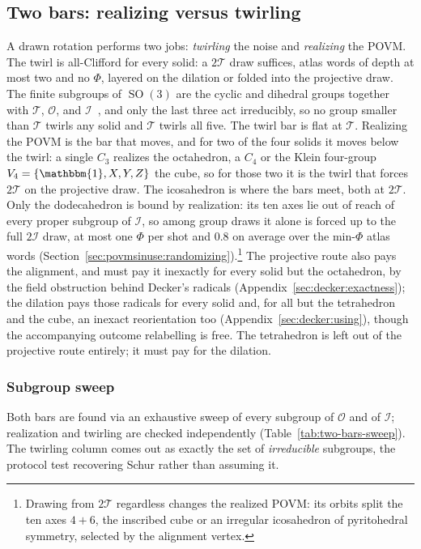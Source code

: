 \documentclass[11pt, oneside, openany]{scrbook}
\DeclareMathOperator{\SO}{SO}
\newcommand{\Id}{\mathbbm{1}}
\newcommand{\Tgroup}{\mathcal{T}}  %
\newcommand{\Ogroup}{\mathcal{O}}  %
\newcommand{\Igroup}{\mathcal{I}}  %
\newcommand{\TwoT}{2\Tgroup}
\newcommand{\TwoI}{2\Igroup}
\begin{document}
\subsection{Two bars: realizing versus twirling} \label{sec:shadows:bills}

A drawn rotation performs two jobs: \textit{twirling} the noise and \textit{realizing} the POVM. The twirl is all-Clifford for every solid: a $\TwoT$ draw suffices, atlas words of depth at most two and no $\Phi$, layered on the dilation or folded into the projective draw. The finite subgroups of $\SO(3)$ are the cyclic and dihedral groups together with $\Tgroup$, $\Ogroup$, and $\Igroup$~\cite{artin2011algebra}, and only the last three act irreducibly, so no group smaller than $\Tgroup$ twirls any solid and $\Tgroup$ twirls all five. The twirl bar is flat at $\Tgroup$. Realizing the POVM is the bar that moves, and for two of the four solids it moves below the twirl: a single $C_3$ realizes the octahedron, a $C_4$ or the Klein four-group $V_4 = \{\Id, X, Y, Z\}$ the cube, so for those two it is the twirl that forces $\TwoT$ on the projective draw. The icosahedron is where the bars meet, both at $\TwoT$. Only the dodecahedron is bound by realization: its ten axes lie out of reach of every proper subgroup of $\Igroup$, so among group draws it alone is forced up to the full $\TwoI$ draw, at most one $\Phi$ per shot and $0.8$ on average over the min-$\Phi$ atlas words (Section~\ref{sec:povmsinuse:randomizing}).\footnote{Drawing from $\TwoT$ regardless changes the realized POVM: its orbits split the ten axes $4 + 6$, the inscribed cube or an irregular icosahedron of pyritohedral symmetry, selected by the alignment vertex.} The projective route also pays the alignment, and must pay it inexactly for every solid but the octahedron, by the field obstruction behind Decker's radicals (Appendix~\ref{sec:decker:exactness}); the dilation pays those radicals for every solid and, for all but the tetrahedron and the cube, an inexact reorientation too (Appendix~\ref{sec:decker:using}), though the accompanying outcome relabelling is free. The tetrahedron is left out of the projective route entirely; it must pay for the dilation.

\subsubsection{Subgroup sweep} \label{sec:shadows:bills:sweep}

Both bars are found via an exhaustive sweep of every subgroup of $\Ogroup$ and of $\Igroup$; realization and twirling are checked independently (Table~\ref{tab:two-bars-sweep}). The twirling column comes out as exactly the set of \textit{irreducible} subgroups, the protocol test recovering Schur rather than assuming it.
\end{document}
